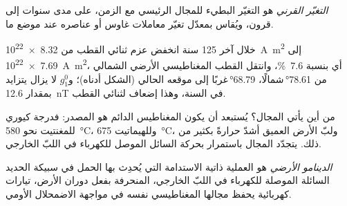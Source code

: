 \begin{definition}\label{def:b3:palaeomagnetism:secular}
\emph{التغيّر القرني} هو التغيّر البطيء للمجال
الرئيسي مع الزمن، على مدى سنوات إلى قرون، ويُقاس بمعدّل تغيّر
معاملات غاوس أو عناصره عند موضع ما.
\end{definition}

خلال آخر 125 سنة انخفض عزم ثنائي القطب من
\qty{8.32e22}{A.m^2} إلى \qty{7.69e22}{A.m^2}، أي بنسبة \qty{7.6}{\percent}، وانتقل القطب
المغناطيسي الأرضي الشمالي من \ang{78.61}\,شمالًا، \ang{68.79}\,غربًا إلى موقعه الحالي
(الشكل أدناه)؛ و$g_1^0$ لا يزال يتزايد بمقدار \qty{12.6}{nT} في السنة،
وهذا إضعاف لثنائي القطب.

\begin{omfigure}

\par{}\label{fig:b3:palaeomagnetism:dipole}
\end{omfigure}

من أين يأتي المجال؟ يُستبعد أن يكون المغناطيس الدائم هو المصدر: فدرجة
كيوري للمغنتيت نحو \qty{580}{\celsius}، وللهيماتيت
\qty{675}{\celsius}، ولبّ الأرض العميق أشدّ حرارةً بكثير من ذلك. يتجدّد
المجال باستمرار بحركة السائل الموصل للكهرباء في اللبّ
الخارجي.

\begin{definition}\label{def:b3:palaeomagnetism:geodynamo}
\emph{الدينامو الأرضي} هو العملية ذاتية الاستدامة التي
يُحدِث بها الحمل في سبيكة الحديد السائلة الموصلة للكهرباء في اللبّ الخارجي،
المنحرفة بفعل دوران الأرض، تيارات كهربائية يحفظ مجالها المغناطيسي نفسه
في مواجهة الاضمحلال الأومي.
\end{definition}

